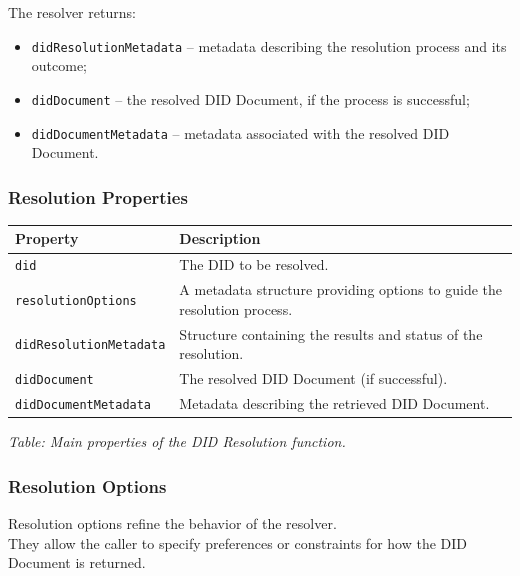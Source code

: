 \noindent
The resolver returns:
\begin{itemize}
    \item \texttt{didResolutionMetadata} – metadata describing the resolution process and its outcome;
    \item \texttt{didDocument} – the resolved DID Document, if the process is successful;
    \item \texttt{didDocumentMetadata} – metadata associated with the resolved DID Document.
\end{itemize}

\subsubsection *{Resolution Properties}

\noindent
\begin{center}
\begin{tabularx}{\textwidth}{
|>{\raggedright\arraybackslash}p{}|
>{\raggedright\arraybackslash}X|}
\hline
\textbf{Property} & \textbf{Description} \\
\hline
\texttt{did} & The DID to be resolved. \\
\texttt{resolutionOptions} & A metadata structure providing options to guide the resolution process. \\
\texttt{didResolutionMetadata} & Structure containing the results and status of the resolution. \\
\texttt{didDocument} & The resolved DID Document (if successful). \\
\texttt{didDocumentMetadata} & Metadata describing the retrieved DID Document. \\
\hline
\end{tabularx}
\end{center}

\smallskip
\textit{Table: Main properties of the DID Resolution function.}


\subsubsection *{Resolution Options}
Resolution options refine the behavior of the resolver.\\  
They allow the caller to specify preferences or constraints for how the DID Document is returned.

